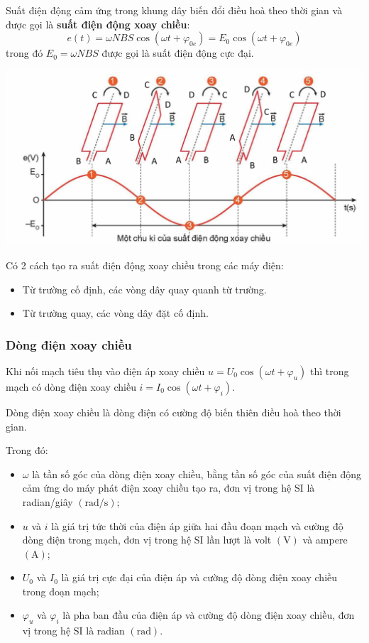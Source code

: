 \begin{tomtat}
\begin{equation}
\end{equation}
Suất điện động cảm ứng trong khung dây biến đổi điều hoà theo thời gian và được gọi là \textbf{suất điện động xoay chiều}:
\begin{equation}
	e\left(t\right)=\omega NBS\cos\left(\omega t+\varphi_{0e}\right)=E_0\cos\left(\omega t+\varphi_{0e}\right)
\end{equation}
trong đó $E_0=\omega NBS$ được gọi là suất điện động cực đại.
\begin{center}
	\includegraphics[width=0.8\linewidth]{figs/VN12-Y24-PH-SYL-023-2}
\end{center}
\begin{luuy}
	Có 2 cách tạo ra suất điện động xoay chiều trong các máy điện:
	\begin{itemize}
		\item Từ trường cố định, các vòng dây quay quanh từ trường.
		\item Từ trường quay, các vòng dây đặt cố định.
	\end{itemize}
\end{luuy}
\subsubsection{Dòng điện xoay chiều}
Khi nối mạch tiêu thụ vào điện áp xoay chiều $u=U_0\cos\left(\omega t+\varphi_{u}\right)$ thì trong mạch có dòng điện xoay chiều $i=I_0\cos\left(\omega t+\varphi_{i}\right)$.\\
\begin{dn}
	Dòng điện xoay chiều là dòng điện có cường độ biến thiên điều hoà theo thời gian.
\end{dn}
Trong đó:
\begin{itemize}
	\item $\omega$ là tần số góc của dòng điện xoay chiều, bằng tần số góc của suất điện động cảm ứng do máy phát điện xoay chiều tạo ra, đơn vị trong hệ SI là radian/giây $\left(\si{\radian/\second}\right)$;
	\item $u$ và $i$ là giá trị tức thời của điện áp giữa hai đầu đoạn mạch và cường độ dòng điện trong mạch, đơn vị trong hệ SI lần lượt là volt $\left(\si{\volt}\right)$ và ampere $\left(\si{\ampere}\right)$;
	\item $U_0$ và $I_0$ là giá trị cực đại của điện áp và cường độ dòng điện xoay chiều trong đoạn mạch;
	\item $\varphi_u$ và $\varphi_i$ là pha ban đầu của điện áp và cường độ dòng điện xoay chiều, đơn vị trong hệ SI là radian $\left(\si{\radian}\right)$.
\end{itemize}

\end{tomtat}
